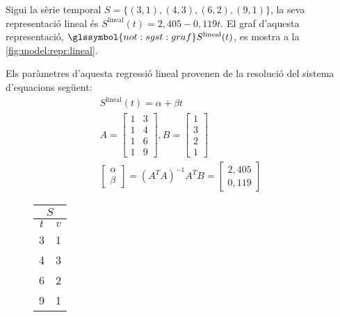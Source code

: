 \begin{example}
  Sigui la sèrie temporal $S=\{ (3,1), (4,3), (6,2), (9,1) \}$, la
  seva representació lineal és $S^\text{lineal}(t) =
  2{,}405-0{,}119t$.  El graf d'aquesta representació,
  $\glssymbol{not:sgst:graf} S^\text{lineal}(t)$, es mostra a la
  \autoref{fig:model:repr:lineal}.

  Els paràmetres d'aquesta regressió lineal provenen de la resolució del
  sistema d'equacions següent:
  \begin{gather*}
    S^\text{lineal}(t) =  \alpha + \beta t \\
     A= \left[\begin{array}{cc}
        1 & 3 \\
        1 & 4 \\
        1 & 6 \\
        1 & 9 
      \end{array}\right],
    B=\left[\begin{array}{c}
        1 \\
        3 \\
        2 \\
        1
      \end{array}\right]\\     
    \left[\begin{array}{c}
        \alpha \\
        \beta
      \end{array}\right] 
    =  (A^TA)^{-1}A^TB =
    \left[\begin{array}{c}
        2{,}405 \\
        0{,}119
      \end{array}\right]   
   \end{gather*}




  \begin{figure}[tp]
  \centering
  \begin{tabular}[c]{|c|c|}
    \multicolumn{2}{c}{$S$} \\ \hline
    $t$  & $v$ \\ \hline
    3  & 1 \\
    4  & 3 \\
    6  & 2 \\
    9  & 1 \\ \hline
  \end{tabular} \qquad
\end{figure}
\end{example}
